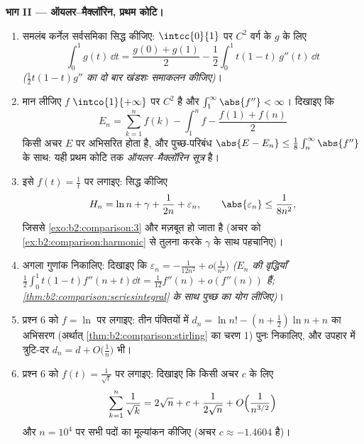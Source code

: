 \begin{problem}
\medskip
\noindent\textbf{भाग II --- ऑयलर--मैक्लॉरिन, प्रथम कोटि।}
\begin{enumerate}[resume]
  \item समलंब कर्नेल सर्वसमिका सिद्ध कीजिए: $\intcc{0}{1}$ पर $C^2$ वर्ग के $g$ के
        लिए
        \[
        \int_0^1 g(t)\,\dd t = \frac{g(0) + g(1)}{2}
        - \frac12\int_0^1 t(1 - t)\,g''(t)\,\dd t
        \]
        \emph{($\frac12 t(1-t)g''$ का दो बार खंडशः समाकलन कीजिए)}।
  \item मान लीजिए $f$ $\intco{1}{+\infty}$ पर $C^2$ है और $\int_1^\infty \abs{f''} < \infty$। दिखाइए कि
        \[
        E_n = \sum_{k=1}^{n} f(k) - \int_1^n f -
        \frac{f(1) + f(n)}{2}
        \]
        किसी अचर $E$ पर अभिसरित होता है, और पुच्छ-परिबंध $\abs{E - E_n} \leq \frac18\int_n^\infty\abs{f''}$ के साथ:
        यही प्रथम कोटि तक \emph{ऑयलर--मैक्लॉरिन सूत्र} है।
  \item इसे $f(t) = \frac1t$ पर लगाइए: सिद्ध कीजिए
        \[
        H_n = \ln n + \gamma + \frac{1}{2n} + \varepsilon_n,
        \qquad \abs{\varepsilon_n} \leq \frac{1}{8n^2},
        \]
        जिससे \cref{exo:b2:comparison:3} और मज़बूत हो जाता है (अचर को \cref{ex:b2:comparison:harmonic} से तुलना करके
        $\gamma$ के साथ पहचानिए)।
  \item अगला गुणांक निकालिए: दिखाइए कि $\varepsilon_n =
        -\frac{1}{12n^2} + o\bigl(\frac1{n^2}\bigr)$ \emph{($E_n$ की वृद्धियाँ
        $\frac12\int_0^1t(1-t)f''(n+t)\dd t =
        \frac1{12}f''(n) + o(f''(n))$ हैं; \cref{thm:b2:comparison:seriesintegral} के साथ पुच्छ का योग लीजिए)}।
  \item प्रश्न 6 को $f = \ln$ पर लगाइए: तीन पंक्तियों में $d_n = \ln n! - (n +
        \frac12)\ln n + n$ का अभिसरण
        (अर्थात् \cref{thm:b2:comparison:stirling} का चरण 1) पुनः निकालिए, और उपहार में त्रुटि-दर
        $d_n = d + O\bigl(\frac1n\bigr)$ भी।
  \item प्रश्न 6 को $f(t) = \frac{1}{\sqrt t}$ पर लगाइए: दिखाइए कि किसी अचर $c$ के लिए
        \[
        \sum_{k=1}^{n}\frac1{\sqrt k} = 2\sqrt n + c +
        \frac{1}{2\sqrt n} + O\Bigl(\frac{1}{n^{3/2}}\Bigr)
        \]
        और $n =
        10^4$ पर सभी पदों का मूल्यांकन कीजिए (अचर $c \approx -1.4604$ है)।
\end{enumerate}


\end{problem}
